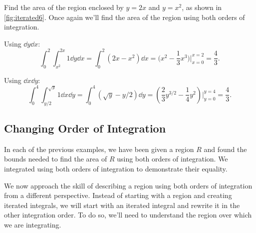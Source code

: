 \begin{example}\label{ex_iterated6}
Find the area of the region enclosed by $y=2x$ and $y=x^2$, as shown in \autoref{fig:iterated6}.
%
\solution
Once again we'll find the area of the region using both orders of integration. 

Using $\dd y\dd x$:
\[
\int_0^2\int_{x^2}^{2x}1\dd y \dd x = \int_0^2(2x-x^2)\dd x
= \bigl(x^2-\frac13x^3\bigr)\Big|_{x=0}^{x=2} = \frac43.
\]

Using $\dd x\dd y$:
\[
\int_0^4\int_{y/2}^{\sqrt{y}} 1\dd x\dd y = \int_0^4 (\sqrt{y}-y/2)\dd y
= \left(\frac23y^{3/2} - \frac14y^2\right)\Big|_{y=0}^{y=4} = \frac43.
\]
\end{example}

\subsection{Changing Order of Integration}

In each of the previous examples, we have been given a region $R$ and found the bounds needed to find the area of $R$ using both orders of integration. We integrated using both orders of integration to demonstrate their equality.

We now approach the skill of describing a region using both orders of integration from a different perspective. Instead of starting with a region and creating iterated integrals, we will start with an iterated integral and rewrite it in the other integration order. To do so, we'll need to understand the region over which we are integrating.

